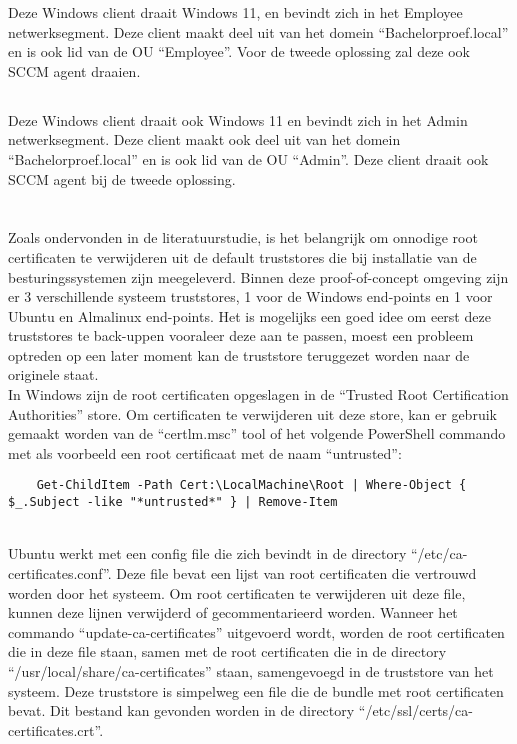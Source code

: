 Deze Windows client draait Windows 11, en bevindt zich in het Employee netwerksegment. Deze client maakt deel uit van het domein ``Bachelorproef.local'' en is ook lid van de OU ``Employee''.
Voor de tweede oplossing zal deze ook SCCM agent draaien.

\subsection{}
\label{subsec:Admin-client}

Deze Windows client draait ook Windows 11 en bevindt zich in het Admin netwerksegment. Deze client maakt ook deel uit van het domein ``Bachelorproef.local'' en is ook lid van de OU ``Admin''.
Deze client draait ook SCCM agent bij de tweede oplossing.

\section{}%
\label{sec:Preparing_truststores}
Zoals ondervonden in de literatuurstudie, is het belangrijk om onnodige root certificaten te verwijderen uit de default truststores die bij installatie van de besturingssystemen zijn meegeleverd. Binnen deze proof-of-concept omgeving zijn er 3 verschillende systeem truststores, 1 voor de Windows end-points en 1 voor Ubuntu en Almalinux end-points.
Het is mogelijks een goed idee om eerst deze truststores te back-uppen vooraleer deze aan te passen, moest een probleem optreden op een later moment kan de truststore teruggezet worden naar de originele staat. \\

In Windows zijn de root certificaten opgeslagen in de ``Trusted Root Certification Authorities'' store. Om certificaten te verwijderen uit deze store, kan er gebruik gemaakt worden van de ``certlm.msc'' tool of het volgende PowerShell commando met als voorbeeld een root certificaat met de naam ``untrusted'':
\begin{verbatim}
    Get-ChildItem -Path Cert:\LocalMachine\Root | Where-Object { $_.Subject -like "*untrusted*" } | Remove-Item
\end{verbatim}
\\

Ubuntu werkt met een config file die zich bevindt in de directory ``/etc/ca-certificates.conf''. Deze file bevat een lijst van root certificaten die vertrouwd worden door het systeem. Om root certificaten te verwijderen uit deze file, kunnen deze lijnen verwijderd of gecommentarieerd worden.
Wanneer het commando ``update-ca-certificates'' uitgevoerd wordt, worden de root certificaten die in deze file staan, samen met de root certificaten die in de directory ``/usr/local/share/ca-certificates'' staan, samengevoegd in de truststore van het systeem. Deze truststore is simpelweg een file die de bundle met root certificaten bevat. 
Dit bestand kan gevonden worden in de directory ``/etc/ssl/certs/ca-certificates.crt''. \\


